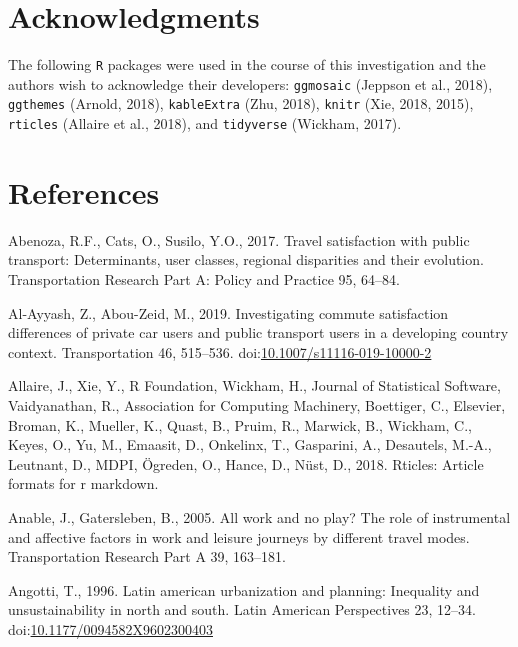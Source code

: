 \documentclass[]{elsarticle} %
\begin{document}
\hypertarget{acknowledgments}{%
\section{Acknowledgments}\label{acknowledgments}}

The following \texttt{R} packages were used in the course of this
investigation and the authors wish to acknowledge their developers:
\texttt{ggmosaic} (Jeppson et al., 2018), \texttt{ggthemes} (Arnold,
2018), \texttt{kableExtra} (Zhu, 2018), \texttt{knitr} (Xie, 2018,
2015), \texttt{rticles} (Allaire et al., 2018), and \texttt{tidyverse}
(Wickham, 2017).

\hypertarget{references}{%
\section*{References}\label{references}}

\hypertarget{refs}{}
\leavevmode\hypertarget{ref-Abenoza2017travel}{}%
Abenoza, R.F., Cats, O., Susilo, Y.O., 2017. Travel satisfaction with
public transport: Determinants, user classes, regional disparities and
their evolution. Transportation Research Part A: Policy and Practice 95,
64--84.

\leavevmode\hypertarget{ref-Alayyash2019commute}{}%
Al-Ayyash, Z., Abou-Zeid, M., 2019. Investigating commute satisfaction
differences of private car users and public transport users in a
developing country context. Transportation 46, 515--536.
doi:\href{https://doi.org/10.1007/s11116-019-10000-2}{10.1007/s11116-019-10000-2}

\leavevmode\hypertarget{ref-Allaire2018rticles}{}%
Allaire, J., Xie, Y., R Foundation, Wickham, H., Journal of Statistical
Software, Vaidyanathan, R., Association for Computing Machinery,
Boettiger, C., Elsevier, Broman, K., Mueller, K., Quast, B., Pruim, R.,
Marwick, B., Wickham, C., Keyes, O., Yu, M., Emaasit, D., Onkelinx, T.,
Gasparini, A., Desautels, M.-A., Leutnant, D., MDPI, Ögreden, O., Hance,
D., Nüst, D., 2018. Rticles: Article formats for r markdown.

\leavevmode\hypertarget{ref-Anable2005work}{}%
Anable, J., Gatersleben, B., 2005. All work and no play? The role of
instrumental and affective factors in work and leisure journeys by
different travel modes. Transportation Research Part A 39, 163--181.

\leavevmode\hypertarget{ref-Angotti1996latin}{}%
Angotti, T., 1996. Latin american urbanization and planning: Inequality
and unsustainability in north and south. Latin American Perspectives 23,
12--34.
doi:\href{https://doi.org/10.1177/0094582X9602300403}{10.1177/0094582X9602300403}
\end{document}
